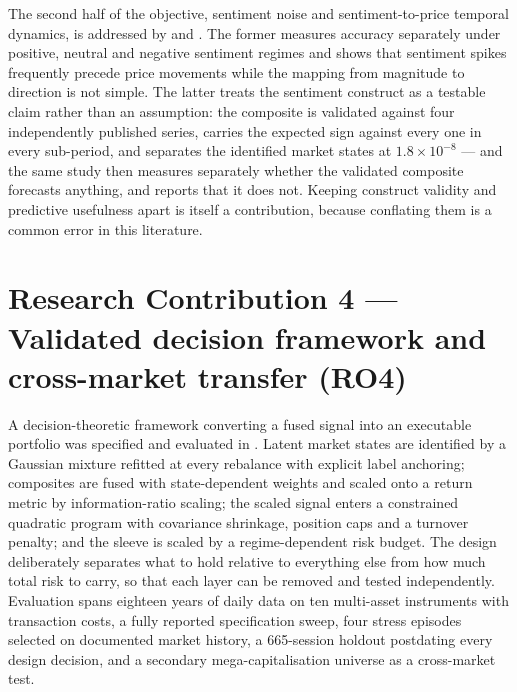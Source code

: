 The second half of the objective, sentiment noise and sentiment-to-price temporal dynamics,
is addressed by  and . The former measures accuracy separately
under positive, neutral and negative sentiment regimes and shows that sentiment spikes
frequently precede price movements while the mapping from magnitude to direction is not
simple. The latter treats the sentiment construct as a testable claim rather than an
assumption: the composite is validated against four independently published series, carries
the expected sign against every one in every sub-period, and separates the identified
market states at $1.8 \times 10^{-8}$ --- and the same study then measures separately
whether the validated composite forecasts anything, and reports that it does not. Keeping
construct validity and predictive usefulness apart is itself a contribution, because
conflating them is a common error in this literature.

\section{Research Contribution 4 --- Validated decision framework and cross-market
transfer (RO4)}

A decision-theoretic framework converting a fused signal into an executable portfolio was
specified and evaluated in . Latent market states are identified by a Gaussian
mixture refitted at every rebalance with explicit label anchoring; composites are fused
with state-dependent weights and scaled onto a return metric by information-ratio scaling;
the scaled signal enters a constrained quadratic program with covariance shrinkage,
position caps and a turnover penalty; and the sleeve is scaled by a regime-dependent risk
budget. The design deliberately separates what to hold relative to everything else from how
much total risk to carry, so that each layer can be removed and tested independently.
Evaluation spans eighteen years of daily data on ten multi-asset instruments with
transaction costs, a fully reported specification sweep, four stress episodes selected on
documented market history, a 665-session holdout postdating every design decision, and a
secondary mega-capitalisation universe as a cross-market test.

